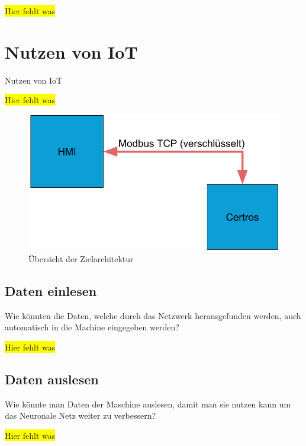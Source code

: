 \colorbox{yellow}{Hier fehlt was}

\section{Nutzen von IoT}
Nutzen von IoT

\colorbox{yellow}{Hier fehlt was}

\begin{figure}[h]
    \centering
    \includegraphics[width=\textwidth]{images/kapitel_6/iot_waage.pdf}
    \caption{Übersicht der Zielarchitektur}
    \label{fig:ausblick_iot}
\end{figure}

\subsection{Daten einlesen}
Wie könnten die Daten, welche durch das Netzwerk herausgefunden werden, auch automatisch in die Machine eingegeben werden?

\colorbox{yellow}{Hier fehlt was}

\subsection{Daten auslesen}
Wie könnte man Daten der Maschine auslesen, damit man sie nutzen kann um das Neuronale Netz weiter zu verbessern?

\colorbox{yellow}{Hier fehlt was}